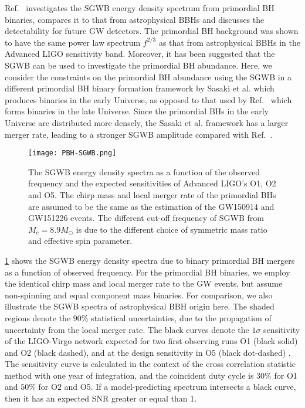Ref.~\cite{Mandic:2016lcn} investigates the \ac{SGWB} energy density spectrum from primordial \ac{BH} binaries, compares it to that from astrophysical \acp{BBH} and discusses the detectability for future \ac{GW} detectors.
The primordial \ac{BH} background was shown to have the same power law spectrum $f^{2/3}$ as that from astrophysical \acp{BBH} in the Advanced LIGO sensitivity band.
Moreover, it has been suggested that the SGWB can be used to investigate the primordial \ac{BH} abundance. 
Here, we consider the constraints on the primordial \ac{BH} abundance using the \ac{SGWB} in a different primordial \ac{BH} binary formation framework by Sasaki et al. which produces binaries in the early Universe, as opposed to that used by Ref.~\cite{Mandic:2016lcn} which forms binaries in the late Universe.
Since the primordial \acp{BH} in the early Universe are distributed more densely, the Sasaki et al. framework has a larger merger rate, leading to a stronger \ac{SGWB} amplitude compared with Ref.~\cite{Mandic:2016lcn}.

\begin{figure}[htbp]
	\centering
	\texttt{[image: PBH-SGWB.png]}
	\caption{The \ac{SGWB} energy density spectra as a function of the observed frequency and the expected sensitivities of Advanced LIGO’s O1, O2 and O5. 
	The chirp mass and local merger rate of the primordial \acp{BH} are assumed to be the same as the estimation of the GW150914 and GW151226 events. 
	The different cut-off frequency of SGWB from $M_c = 8.9M_\odot$ is due to the different choice of symmetric mass ratio and effective spin parameter.}
	\label{fig:PBH-SGWB}
\end{figure}

\cref{fig:PBH-SGWB} shows the \ac{SGWB} energy density spectra due to binary primordial \ac{BH} mergers as a function of observed frequency.
For the primordial \ac{BH} binaries, we employ the identical chirp mass and local merger rate to the \ac{GW} events, but assume non-spinning and equal component mass binaries. 
For comparison, we also illustrate the \ac{SGWB} spectra of astrophysical \ac{BBH} origin here. 
The shaded regions denote the $90\%$ statistical uncertainties, due to the propagation of uncertainty from the local merger rate. 
The black curves denote the $1\sigma$ sensitivity of the LIGO-Virgo network expected for two first observing runs O1 (black solid) and O2 (black dashed), and at the design sensitivity in O5 (black dot-dashed) \cite{TheLIGOScientific:2016wyq,Thrane:2013oya}. 
The sensitivity curve is calculated in the context of the cross correlation statistic method \cite{Allen:1997ad} with one year of integration, and the coincident duty cycle is $30\%$ for O1 and $50\%$ for O2 and O5. 
If a model-predicting spectrum intersects a black curve, then it has an expected \ac{SNR} greater or equal than 1.

